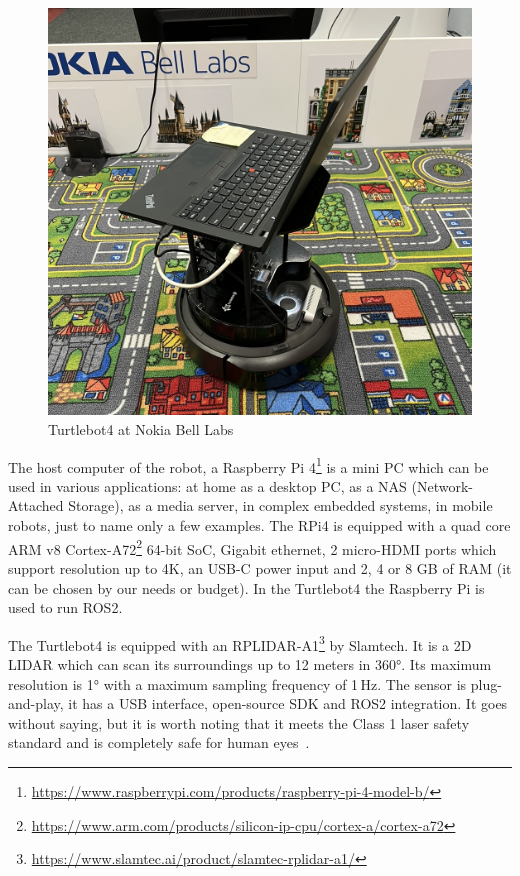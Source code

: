 \begin{figure}[htbp]
    \centering
    \includegraphics[width=150mm, keepaspectratio]{figures/turtlebot4_nokia.JPEG}
    \caption{Turtlebot4 at Nokia Bell Labs}
    \label{fig:turtlebot4_nokia}
\end{figure}




The host computer of the robot, a Raspberry Pi 4\footnote{\url{https://www.raspberrypi.com/products/raspberry-pi-4-model-b/}} is a mini PC which can be used in various applications:
at home as a desktop PC,
as a NAS (Network-Attached Storage),
as a media server,
in complex embedded systems,
in mobile robots, just to name only a few examples.
The RPi4 is equipped with a quad core ARM v8 Cortex-A72\footnote{\url{https://www.arm.com/products/silicon-ip-cpu/cortex-a/cortex-a72}} 64-bit SoC, Gigabit ethernet, 2 micro-HDMI ports which support resolution up to 4K, an USB-C power input and 2, 4 or 8 GB of RAM (it can be chosen by our needs or budget). In the Turtlebot4 the Raspberry Pi is used to run ROS2.


The Turtlebot4 is equipped with an RPLIDAR-A1\footnote{\url{https://www.slamtec.ai/product/slamtec-rplidar-a1/}} by Slamtech. It is a 2D LIDAR which can scan its surroundings up to 12 meters in 360°. Its maximum resolution is 1° with a maximum sampling frequency of 1\,Hz.
The sensor is plug-and-play, it has a USB interface, open-source SDK and ROS2 integration. It goes without saying, but it is worth noting that it meets the Class 1 laser safety standard and is completely safe for human eyes~\cite{LaserSafety}.

